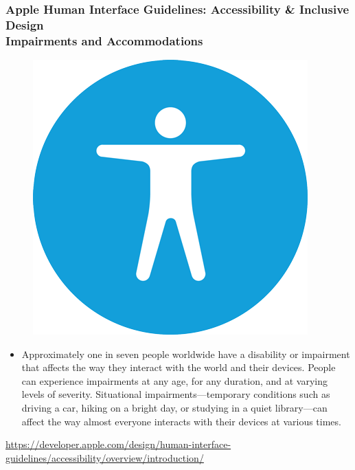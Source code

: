 \documentclass[screen, aspectratio=169]{beamer}
\begin{document}
%
\begin{frame}
\frametitle{Apple Human Interface Guidelines: Accessibility \& Inclusive Design\\Impairments and Accommodations}
 \begin{figure}
	\includegraphics[scale=0.18]{img/apple-accessibility-icon_2x.png}
    \end{figure}
\begin{itemize}
\item Approximately one in seven people worldwide have a disability or impairment that affects the way they interact with the world and their devices. People can experience impairments at any age, for any duration, and at varying levels of severity. Situational impairments---temporary conditions such as driving a car, hiking on a bright day, or studying in a quiet library---can affect the way almost everyone interacts with their devices at various times.
\end{itemize} 
{\scriptsize \url{https://developer.apple.com/design/human-interface-guidelines/accessibility/overview/introduction/}    }
\end{frame}
%
%
\end{document}
